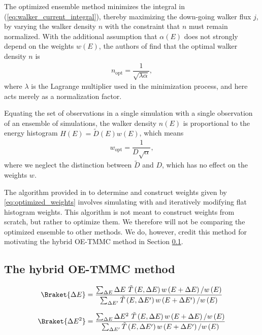 \documentclass[11pt]{article}
\newcommand{\bk}{\Braket} %
\renewcommand{\t}{\text} %
\newcommand{\f}[2]{\dfrac{#1}{#2}} %
\newcommand{\p}[1]{\left(#1\right)} %
\begin{document}
The optimized ensemble method minimizes the integral in
(\ref{eq:walker_current_integral}), thereby maximizing the down-going
walker flux $j$, by varying the walker density $n$ with the constraint
that $n$ must remain normalized. With the additional assumption that
$\alpha\p{E}$ does not strongly depend on the weights $w\p{E}$, the
authors of \cite{optimized_ensemble} find that the optimal walker
density $n$ is
\begin{align}
  n_{\t{opt}}=\f1{\sqrt{\lambda\alpha}},
  \label{eq:optimal_walker_density}
\end{align}
where $\lambda$ is the Lagrange multiplier used in the minimization
process, and here acts merely as a normalization factor.

Equating the set of observations in a single simulation with a single
observation of an ensemble of simulations, the walker density $n\p{E}$
is proportional to the energy histogram $H\p{E}=\tilde D\p{E}w\p{E}$,
which means
\begin{align}
  w_{\t{opt}}=\f1{D\sqrt{\alpha}},
  \label{eq:optimized_weights}
\end{align}
where we neglect the distinction between $\tilde D$ and $D$, which has
no effect on the weights $w$.

The algorithm provided in \cite{optimized_ensemble} to determine and
construct weights given by \ref{eq:optimized_weights} involves
simulating with and iteratively modifying flat histogram weights. This
algorithm is not meant to construct weights from scratch, but rather
to optimize them. We therefore will not be comparing the optimized
ensemble to other methods. We do, however, credit this method for
motivating the hybrid OE-TMMC method in Section \ref{sec:oetmmc}.

\subsection{The hybrid OE-TMMC method}
\label{sec:oetmmc}


\begin{align}
  \bk{\Delta E}=\f{\sum_{\Delta E}\Delta E~\tilde T\p{E,\Delta E}
    w\p{E+\Delta E}/w\p{E}}{\sum_{\Delta E'}\tilde T\p{E,\Delta E'}
    w\p{E+\Delta E'}/w\p{E}}
\end{align}

\begin{align}
  \bk{\Delta E^2}=\f{\sum_{\Delta E}\Delta E^2~\tilde T\p{E,\Delta E}
    w\p{E+\Delta E}/w\p{E}}{\sum_{\Delta E'}\tilde T\p{E,\Delta E'}
    w\p{E+\Delta E'}/w\p{E}}
\end{align}
\end{document}
